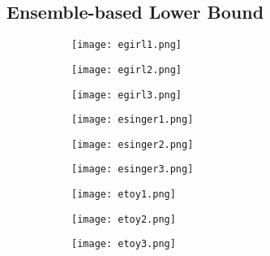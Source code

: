 \documentclass{article}
\begin{document}
\subsection{Ensemble-based Lower Bound}\label{subsection:en}
\begin{figure}[!htb]
    \centering
    \begin{subfigure}{0.3\textwidth}
        \centering
        \texttt{[image: egirl1.png]}
    \end{subfigure}
    \begin{subfigure}{0.3\textwidth}
        \centering
        \texttt{[image: egirl2.png]}
    \end{subfigure}
    \begin{subfigure}{0.3\textwidth}
        \centering
        \texttt{[image: egirl3.png]}
    \end{subfigure}
\end{figure}

\vspace{-0.7cm}

\begin{figure}[!htb]
    \centering
    \begin{subfigure}{0.3\textwidth}
        \centering
        \texttt{[image: esinger1.png]}
    \end{subfigure}
    \begin{subfigure}{0.3\textwidth}
        \centering
        \texttt{[image: esinger2.png]}
    \end{subfigure}
    \begin{subfigure}{0.3\textwidth}
        \centering
        \texttt{[image: esinger3.png]}
    \end{subfigure}
\end{figure}

\vspace{-0.7cm}

\begin{figure}[!htb]
    \centering
    \begin{subfigure}{0.3\textwidth}
        \centering
        \texttt{[image: etoy1.png]}
    \end{subfigure}
    \begin{subfigure}{0.3\textwidth}
        \centering
        \texttt{[image: etoy2.png]}
    \end{subfigure}
    \begin{subfigure}{0.3\textwidth}
        \centering
        \texttt{[image: etoy3.png]}
    \end{subfigure}
\end{figure}
\end{document}
